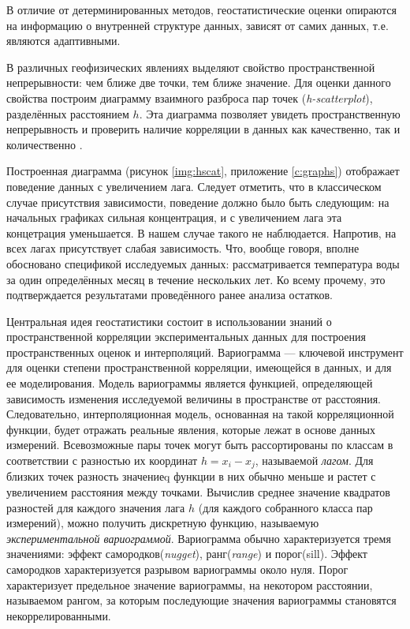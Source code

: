 В отличие от детерминированных методов, геостатистические оценки опираются на информацию о внутренней структуре данных, зависят от самих данных, т.е. являются адаптивными.

В различных геофизических явлениях выделяют свойство пространственной непрерывности: чем ближе две точки, тем ближе значение. Для оценки данного свойства построим диаграмму взаимного разброса пар точек (\textit{h-scatterplot}), разделённых расстоянием $ h $. Эта диаграмма позволяет увидеть пространственную непрерывность и проверить наличие корреляции в данных как качественно, так и количественно \cite{saveliev2012}.

Построенная диаграмма (рисунок \ref{img:hscat}, приложение \ref{c:graphs}) отображает поведение данных с увеличением лага. Следует отметить, что в классическом случае присутствия зависимости, поведение должно было быть следующим: на начальных графиках сильная концентрация, и с увеличением лага эта концетрация уменьшается. В нашем случае такого не наблюдается. Напротив, на всех лагах присутствует слабая зависимость. Что, вообще говоря, вполне обосновано спецификой исследуемых данных: рассматривается температура воды за один определённых месяц в течение нескольких лет. Ко всему прочему, это подтверждается результатами проведённого ранее анализа остатков.

Центральная идея геостатистики состоит в использовании знаний о пространственной корреляции экспериментальных данных для построения пространственных оценок и интерполяций. Вариограмма --- ключевой инструмент для оценки степени пространственной корреляции, имеющейся в данных, и для ее моделирования. Модель вариограммы является функцией, определяющей зависимость изменения исследуемой величины в пространстве от расстояния. Следовательно, интерполяционная модель, основанная на такой корреляционной функции, будет отражать реальные явления, которые лежат в основе данных измерений. Всевозможные пары точек могут быть рассортированы по классам в соответствии с разностью их координат $ h = x_i - x_j $, называемой \textit{лагом}. Для близких точек разность значениеq функции в них обычно меньше и растет с увеличением расстояния между точками. Вычислив среднее значение квадратов разностей для каждого значения лага $h$ (для каждого собранного класса пар измерений), можно получить дискретную функцию, называемую \textit{экспериментальной вариограммой}. Вариограмма обычно характеризуется тремя значениями: эффект самородков(\textit{nugget}), ранг(\textit{range}) и порог(sill). Эффект самородков характеризуется разрывом вариограммы около нуля. Порог характеризует предельное значение вариограммы, на некотором расстоянии, называемом рангом, за которым последующие значения вариограммы становятся некоррелированными.

